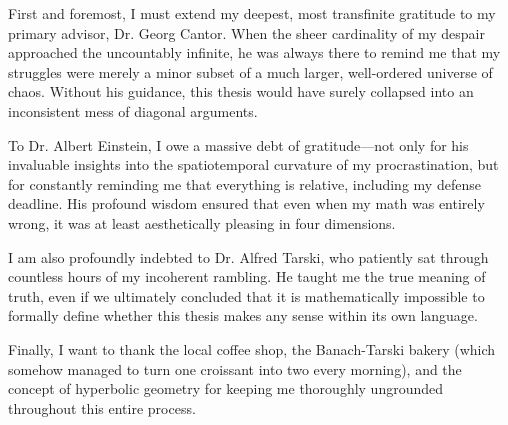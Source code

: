 \begin{acknowledgments}
First and foremost, I must extend my deepest, most transfinite gratitude to my primary advisor, Dr. Georg Cantor. When the sheer cardinality of my despair approached the uncountably infinite, he was always there to remind me that my struggles were merely a minor subset of a much larger, well-ordered universe of chaos. Without his guidance, this thesis would have surely collapsed into an inconsistent mess of diagonal arguments.

To Dr. Albert Einstein, I owe a massive debt of gratitude—not only for his invaluable insights into the spatiotemporal curvature of my procrastination, but for constantly reminding me that everything is relative, including my defense deadline. His profound wisdom ensured that even when my math was entirely wrong, it was at least aesthetically pleasing in four dimensions.

I am also profoundly indebted to Dr. Alfred Tarski, who patiently sat through countless hours of my incoherent rambling. He taught me the true meaning of truth, even if we ultimately concluded that it is mathematically impossible to formally define whether this thesis makes any sense within its own language.

Finally, I want to thank the local coffee shop, the Banach-Tarski bakery (which somehow managed to turn one croissant into two every morning), and the concept of hyperbolic geometry for keeping me thoroughly ungrounded throughout this entire process.

\end{acknowledgments}
